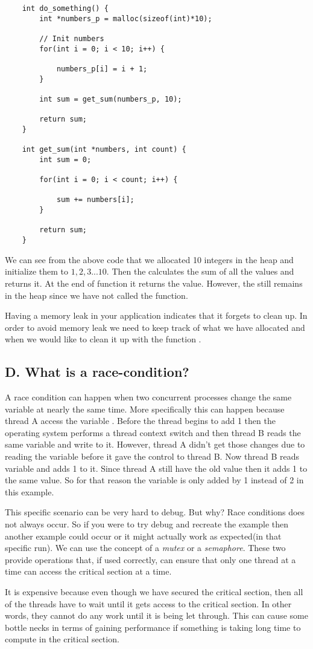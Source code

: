 \begin{lstlisting}
    int do_something() {
        int *numbers_p = malloc(sizeof(int)*10);

        // Init numbers
        for(int i = 0; i < 10; i++) {

            numbers_p[i] = i + 1;
        }

        int sum = get_sum(numbers_p, 10);
        
        return sum;
    }

    int get_sum(int *numbers, int count) {
        int sum = 0;

        for(int i = 0; i < count; i++) {

            sum += numbers[i];
        }

        return sum;
    }
\end{lstlisting}
We can see from the above code that we allocated 10 integers in the heap and initialize them 
to $1, 2, 3 ... 10$. Then the  calculates the sum of all the values and returns it.
At the end of function  it returns the  value. However, the 
still remains in the heap since we have not called the  function.

Having a memory leak in your application indicates that it forgets to clean up.
In order to avoid memory leak we need to keep track of what we have allocated and when we would like to clean it up with the function .

\subsection{D. What is a race-condition?}
A race condition can happen when two concurrent processes change the same variable at nearly the same time. 
More specifically this can happen because thread A access the variable . Before the thread begins to add 1 then the operating system performs a thread context switch and then thread B reads the same variable and write  to it.
However, thread A didn't get those changes due to reading the variable before it gave the control to thread B. Now thread B reads variable and adds 1 to it. Since thread A still have the old value then it adds 1 to the same value. So for that reason the variable is only added by 1 instead of 2 in this example.

This specific scenario can be very hard to debug. But why? Race conditions does not always occur. So if you were to try debug and recreate the example then another example could occur or it might actually work as expected(in that specific run).
We can use the concept of a \textit{mutex} or a \textit{semaphore}. These two provide operations that, if used correctly, can ensure that 
only one thread at a time can access the critical section at a time. 

It is expensive because even though we have secured the critical section, then all of the threads have to wait until it gets access to
the critical section. In other words, they cannot do any work until it is being let through. This can cause some bottle necks in terms of 
gaining performance if something is taking long time to compute in the critical section.
